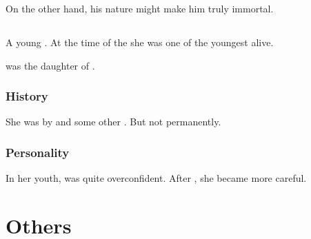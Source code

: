 On the other hand, his \xsic{} nature might make him truly immortal. 















\section{\Zessuruch}
\index{\Zessuruch}
A young \dragon. 
At the time of the \thirdbanewar{} she was one of the youngest \dragons alive. 

\Zessuruch was the daughter of \Thessulax. 









\subsection{History}
She was  by  and some other \resphain. 
But not permanently. 









\subsection{Personality}
In her youth, \Zessuruch was quite overconfident. 
After , she became more careful. 























\chapter{Others}















